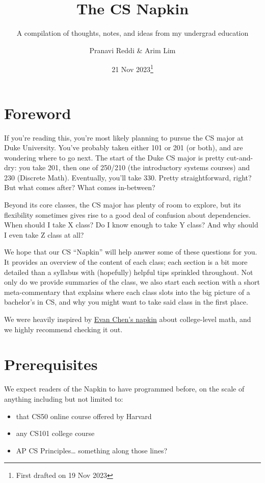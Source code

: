 \documentclass[fontsize=12pt,twoside=on,openright,parskip=half]{scrbook}
\title{The CS Napkin}
\subtitle{A compilation of thoughts, notes, and ideas from my undergrad education}
\author{Pranavi Reddi \& Arim Lim}
\date{21 Nov 2023\thanks{First drafted on 19 Nov 2023}}
\begin{document}
\maketitle

\tableofcontents

\chapter{Foreword}

If you’re reading this, you’re most likely planning to pursue the CS major at
Duke University. You’ve probably taken either 101 or 201 (or both), and are
wondering where to go next. The start of the Duke CS major is pretty
cut-and-dry: you take 201, then one of 250/210 (the introductory systems
courses) and 230 (Discrete Math). Eventually, you’ll take 330. Pretty
straightforward, right? But what comes after? What comes in-between?

Beyond its core classes, the CS major has plenty of room to explore, but its
flexibility sometimes gives rise to a good deal of confusion about
dependencies. When should I take X class? Do I know enough to take Y class? And
why should I even take Z class at all?

We hope that our CS “Napkin” will help answer some of these questions for you.
It provides an overview of the content of each class; each section is a bit
more detailed than a syllabus with (hopefully) helpful tips sprinkled
throughout. Not only do we provide summaries of the class, we also start each
section with a short meta-commentary that explains where each class slots into
the big picture of a bachelor’s in CS, and why you might want to take said
class in the first place.

We were heavily inspired by \href{https://web.evanchen.cc/napkin.html}{Evan
Chen’s napkin} about college-level math, and we highly recommend checking it
out.

\chapter{Prerequisites}

We expect readers of the Napkin to have programmed before, on the scale of
anything including but not limited to:

\begin{itemize}
	\item that CS50 online course offered by Harvard
	\item any CS101 college course
	\item AP CS Principles… something along those lines?
\end{itemize}
\end{document}
